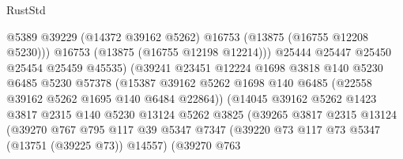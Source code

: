 \begin{lexlean}{RustStd}
\begin{coremodule}
                                        @5389
                                        @39229
                                        (@14372 @39162 @5262)
                                        @16753
                                        (@13875 (@16755 @12208 @5230)))
                                      @16753
                                      (@13875 (@16755 @12198 @12214)))
                                    @25444
                                    @25447
                                    @25450
                                    @25454
                                    @25459
                                    @45535)
                                  (@39241
                                    @23451
                                    @12224
                                    @1698
                                    @3818
                                    @140
                                    @5230
                                    @6485
                                    @5230
                                    @57378
                                    (@15387
                                      @39162
                                      @5262
                                      @1698
                                      @140
                                      @6485
                                      (@22558 @39162 @5262 @1695 @140 @6484 @22864))
                                    (@14045
                                      @39162
                                      @5262
                                      @1423
                                      @3817
                                      @2315
                                      @140
                                      @5230
                                      @13124
                                      @5262
                                      @3825
                                      (@39265
                                        @3817
                                        @2315
                                        @13124
                                        (@39270
                                          @767
                                          @795
                                          @117
                                          @39
                                          @5347
                                          @7347
                                          (@39220 @73 @117 @73 @5347 (@13751 (@39225 @73)) @14557)
                                          (@39270
                                            @763

\end{coremodule}
\end{lexlean}
